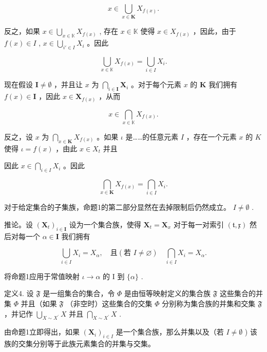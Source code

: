 \[
x \in \bigcup_ {x \in \mathbf {K}} X _ {f (x)}.
\]

反之，如果 \(x \in \bigcup_{x \in \mathbb{K}} X_{f(x)}\) , 存在 \(x \in \mathbb{K}\) 使得 \(x \in X_{f(x)}\) ，因此，由于 \(f(x) \in I\) , \(x \in \bigcup_{i' \in I} X_i\) 。因此

\[
\bigcup_ {x \in \mathbb {K}} X _ {f (x)} = \bigcup_ {i \in I} X _ {i}.
\]

现在假设 \(\mathbf{I} \neq \emptyset\) ，并且让 \(x\) 为 \(\bigcap_{i \in \mathbf{I}} \mathbf{X}_i\) 。对于每个元素 \(x\) 的 \(\mathbf{K}\) 我们拥有 \(f(x) \in \mathbf{I}\) ，因此 \(x \in \mathbf{X}_{f(x)}\) ，从而

\[
x \in \bigcap_ {x \in \mathbb {K}} X _ {f (x)}.
\]

反之，设 \(x\) 为 \(\bigcap_{x \in \mathbf{K}} X_{f(x)}\) 。如果 \(\iota\) 是……的任意元素 \(I\) ，存在一个元素 \(x\) 的 \(K\) 使得 \(\iota = f(x)\) ，由此 \(x \in X_t\) 并且

因此 \(x \in \bigcap_{i \in I} X_i\) 。因此

\[
\bigcap_ {x \in \mathbf {K}} X _ {f (x)} = \bigcap_ {i \in I} X _ {i}.
\]

对于给定集合的子集族，命题1的第二部分显然在去掉限制后仍然成立。 \(I \neq \emptyset\) .

推论。设 \((\mathbf{X}_t)_{i\in \mathbf{I}}\) 设为一个集合族，使得 \(\mathbf{X}_t = \mathbf{X}_x\) 对于每一对索引 \((\mathfrak{t},\mathfrak{x})\) 然后对每一个 \(\alpha \in \mathbf{I}\) 我们拥有

\[
\bigcup_ {i \in I} X _ {i} = X _ {\alpha}, \quad \text{且} (\text{若 } I \neq \varnothing) \quad \bigcap_ {i \in I} X _ {i} = X _ {\alpha}.
\]

将命题1应用于常值映射 \(\iota\to\alpha\) 的 I 到 \(\{\alpha\}\) .

定义4. 设 \(\mathfrak{F}\) 是一组集合的集合，令 \(\Phi\) 是由恒等映射定义的集合族 \(\mathfrak{F}\) 这些集合的并集 \(\Phi\) 并且（如果 \(\mathfrak{F}\) （非空时）这些集合的交集 \(\Phi\) 分别称为集合族的并集和交集 \(\mathfrak{F}\) ，并记作 \(\bigcup_{X\sim X^{\prime}}X\) 并且 \(\bigcap_{X\sim X^{\prime}}X\) .

由命题1立即得出，如果 \((\mathbf{X}_i)_{i\in I}\) 是一个集合族，那么并集以及（若 \(I\neq \emptyset\) ) 该族的交集分别等于此族元素集合的并集与交集。

